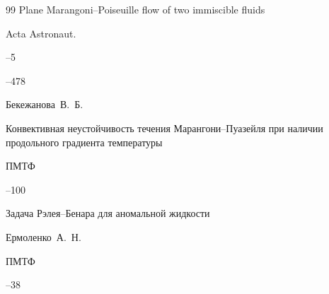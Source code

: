 \begin{thebibliography}{99}
\paper  Plane Marangoni--Poiseuille flow of two immiscible fluids 

\jour Acta Astronaut.



--5

--478







\by Бекежанова~В.~Б.

\paper Конвективная неустойчивость течения Марангони--Пуазейля при наличии продольного градиента температуры

\jour ПМТФ




–100  








\paper Задача Рэлея--Бенара для аномальной жидкости

\by Ермоленко~А.~Н.

\jour ПМТФ




--38















\end{thebibliography}
